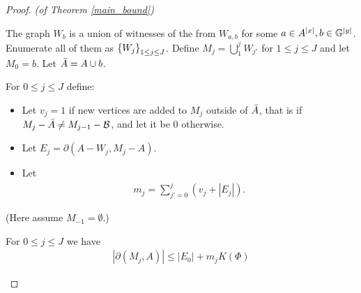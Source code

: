 \begin{proof} \textit{(of Theorem \ref{main_bound})}

  The graph $W_b$ is a union of witnesses of the from $W_{a,b}$ for some $a \in A^{|x|}, b \in \mathbb G^{|y|}$.
  Enumerate all of them as $\left\{W_j\right\}_{1 \leq j \leq J}$.
  Define $M_j = \bigcup_1^j W_{j'}$ for $1 \leq j \leq J$ and let $M_0 = b$.
  Let $\bar A = A \cup b$.
  \begin{Definition}
    For $0 \leq j \leq J$ define:
    \begin{itemize}
    \item Let $v_j = 1$ if new vertices are added to $M_j$ outside of $\bar A$, that is if
      $M_j - \bar A \neq M_{j-1} - \mathcal B$,
      and let it be $0$ otherwise.
    \item Let %
      $E_j = \partial(A - W_j, M_j - A)$.
    \item Let
      \begin{align*}
        m_j = \sum_{j' = 0}^j (v_j + |E_j|).
      \end{align*}
    \end{itemize}
    (Here assume $M_{-1} = \emptyset$.)
  \end{Definition}

  \begin{Lemma} \label{ubd_lemma}
    For $0 \leq j \leq J$ we have
    \begin{align*}
      |\partial(M_j, A)| \leq |E_0| + m_j K(\Phi) 
    \end{align*}
  \end{Lemma}


\end{proof}
